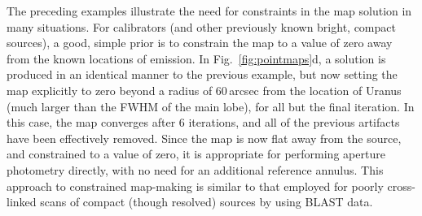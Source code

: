 \documentclass[useAMS,usenatbib,nofootinbib]{mn2e}
\begin{document}
The preceding examples illustrate the need for constraints in the map
solution in many situations. For calibrators (and other previously
known bright, compact sources), a good, simple prior is to constrain
the map to a value of zero away from the known locations of
emission. In Fig.~\ref{fig:pointmaps}d, a solution is produced in an
identical manner to the previous example, but now setting the map
explicitly to zero beyond a radius of 60\,arcsec from the location of
Uranus (much larger than the FWHM of the main lobe), for all but the
final iteration. In this case, the map converges after 6 iterations,
and all of the previous artifacts have been effectively removed. Since
the map is now flat away from the source, and constrained to a value
of zero, it is appropriate for performing aperture photometry
directly, with no need for an additional reference annulus. This
approach to constrained map-making is similar to that employed for
poorly cross-linked scans of compact (though resolved) sources by
\citet{wiebe2009} using BLAST data.
\end{document}
